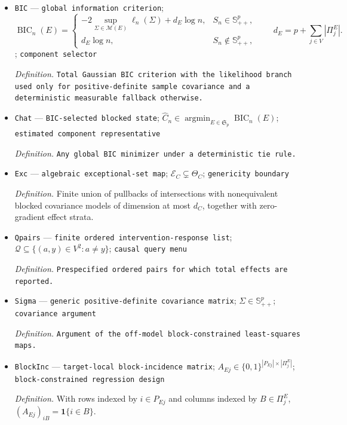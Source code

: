 \documentclass{article}
\begin{document}
\begin{itemize}
  \item \texttt{BIC} --- \texttt{global information criterion}; \[\operatorname{BIC}_n(E)=\begin{cases}-2\sup_{\Sigma\in\mathcal M(E)}\ell_n(\Sigma)+d_E\log n,&S_n\in\mathbb S^p_{++},\\ d_E\log n,&S_n\notin\mathbb S^p_{++},\end{cases}\qquad d_E=p+\sum_{j\in V}|\Pi^E_j|.\]; \texttt{component selector}
  \par\smallskip\noindent\emph{Definition.} \texttt{Total Gaussian BIC criterion with the likelihood branch used only for positive-\allowbreak{}definite sample covariance and a deterministic measurable fallback otherwise.}
  \item \texttt{Chat} --- \texttt{BIC-\allowbreak{}selected blocked state}; \(\widehat C_n\in\operatorname*{argmin}_{E\in\mathfrak S_p}\operatorname{BIC}_n(E)\); \texttt{estimated component representative}
  \par\smallskip\noindent\emph{Definition.} \texttt{Any global BIC minimizer under a deterministic tie rule.}
  \item \texttt{Exc} --- \texttt{algebraic exceptional-\allowbreak{}set map}; \(\mathcal E_C\subsetneq\Theta_C\); \texttt{genericity boundary}
  \par\smallskip\noindent\emph{Definition.} Finite union of pullbacks of intersections with nonequivalent blocked covariance models of dimension at most \(d_C\), together with zero-gradient effect strata.
  \item \texttt{Qpairs} --- \texttt{finite ordered intervention-\allowbreak{}response list}; \(\mathcal Q\subseteq\{(a,y)\in V^2:a\neq y\}\); \texttt{causal query menu}
  \par\smallskip\noindent\emph{Definition.} \texttt{Prespecified ordered pairs for which total effects are reported.}
  \item \texttt{Sigma} --- \texttt{generic positive-\allowbreak{}definite covariance matrix}; \(\Sigma\in\mathbb S^p_{++}\); \texttt{covariance argument}
  \par\smallskip\noindent\emph{Definition.} \texttt{Argument of the off-\allowbreak{}model block-\allowbreak{}constrained least-\allowbreak{}squares maps.}
  \item \texttt{BlockInc} --- \texttt{target-\allowbreak{}local block-\allowbreak{}incidence matrix}; \(A_{Ej}\in\{0,1\}^{|P_{Ej}|\times|\Pi^E_j|}\); \texttt{block-\allowbreak{}constrained regression design}
  \par\smallskip\noindent\emph{Definition.} With rows indexed by \(i\in P_{Ej}\) and columns indexed by \(B\in\Pi^E_j\), \((A_{Ej})_{iB}=\mathbf 1\{i\in B\}\).

\end{itemize}
\end{document}
